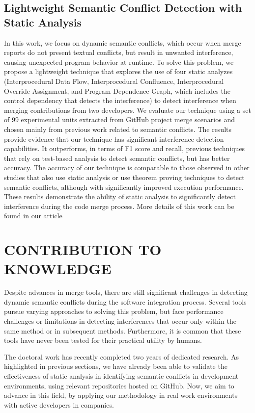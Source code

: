 \documentclass[sigconf,review]{acmart}
\begin{document}
\subsection{Lightweight Semantic Conflict Detection with Static Analysis}
In this work, we focus on dynamic semantic conflicts, which occur when merge reports do not present textual conflicts, but result in unwanted interference, causing unexpected program behavior at runtime.
To solve this problem, we propose a lightweight technique that explores the use of four static analyzes (Interprocedural Data Flow, Interprocedural
Confluence, Interprocedural Override Assignment, and Program Dependence Graph, which includes the control
dependency that detects the interference) to detect interference when merging contributions from two developers.
We evaluate our technique using a set of 99 experimental units extracted from GitHub project merge scenarios and chosen mainly from previous work related to semantic conflicts.
The results provide evidence that our technique has significant interference detection capabilities. It outperforms, in terms of F1 score and recall, previous techniques that rely on test-based analysis to detect semantic conflicts, but has better accuracy.
The accuracy of our technique is comparable to those observed in other studies that also use static analysis or use theorem proving techniques to detect semantic conflicts, although with significantly improved execution performance. These results demonstrate the ability of static analysis to significantly detect interference during the code merge process. More details of this work can be found in our article \cite{galileu}

\section{CONTRIBUTION TO KNOWLEDGE}

Despite advances in merge tools, there are still significant challenges in detecting dynamic semantic conflicts during the software integration process. Several tools pursue varying approaches to solving this problem, but face performance challenges or limitations in detecting interferences that occur only within the same method or in subsequent methods. Furthermore, it is common that these tools have never been tested for their practical utility by humans.

The doctoral work has recently completed two years of dedicated research. As highlighted in previous sections, we have already been able to validate the effectiveness of static analysis in identifying semantic conflicts in development environments, using relevant repositories hosted on GitHub. Now, we aim to advance in this field, by applying our methodology in real work environments with active developers in companies.
\end{document}
